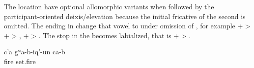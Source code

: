 The location  have optional allomorphic variants when followed by the participant-oriented deixis/elevation   because the initial fricative of the second  is omitted. The  ending in  change that vowel to  under omission of , for example  +  >  +  > ,  +  > . The stop in the   becomes labialized, that is  +  >  .
%
\begin{exe}
	\ex	\label{ex:(Somebody) set up verbs}
	\gll	c'a	gʷa-b-iq'-un	ca-b\\
		fire	set.fire	\\
	\glt	{}
\end{exe}

